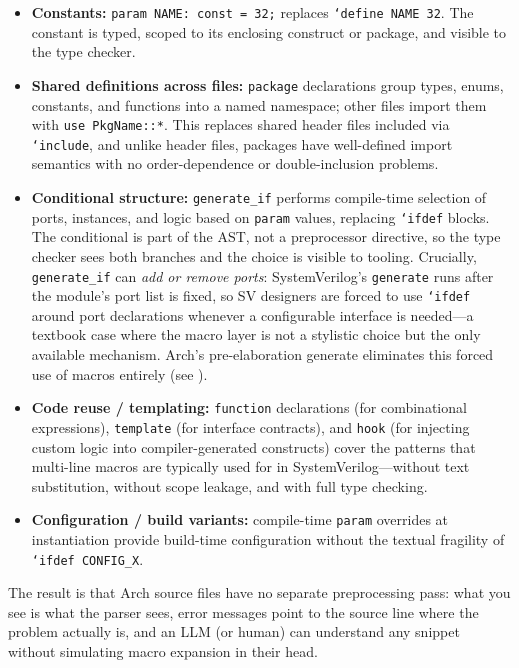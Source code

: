 \documentclass[manuscript]{acmart}
\begin{document}
\begin{itemize}
\item \textbf{Constants:} \texttt{param NAME: const = 32;} replaces \texttt{`define NAME 32}. The constant is typed, scoped to its enclosing construct or package, and visible to the type checker.
\item \textbf{Shared definitions across files:} \texttt{package} declarations group types, enums, constants, and functions into a named namespace; other files import them with \texttt{use PkgName::*}. This replaces shared header files included via \texttt{`include}, and unlike header files, packages have well-defined import semantics with no order-dependence or double-inclusion problems.
\item \textbf{Conditional structure:} \texttt{generate\_if} performs compile-time selection of ports, instances, and logic based on \texttt{param} values, replacing \texttt{`ifdef} blocks. The conditional is part of the AST, not a preprocessor directive, so the type checker sees both branches and the choice is visible to tooling. Crucially, \texttt{generate\_if} can \emph{add or remove ports}: SystemVerilog's \texttt{generate} runs after the module's port list is fixed, so SV designers are forced to use \texttt{`ifdef} around port declarations whenever a configurable interface is needed---a textbook case where the macro layer is not a stylistic choice but the only available mechanism. Arch's pre-elaboration generate eliminates this forced use of macros entirely (see ).
\item \textbf{Code reuse / templating:} \texttt{function} declarations (for combinational expressions), \texttt{template} (for interface contracts), and \texttt{hook} (for injecting custom logic into compiler-generated constructs) cover the patterns that multi-line macros are typically used for in SystemVerilog---without text substitution, without scope leakage, and with full type checking.
\item \textbf{Configuration / build variants:} compile-time \texttt{param} overrides at instantiation provide build-time configuration without the textual fragility of \texttt{`ifdef CONFIG\_X}.
\end{itemize}

The result is that Arch source files have no separate preprocessing pass: what you see is what the parser sees, error messages point to the source line where the problem actually is, and an LLM (or human) can understand any snippet without simulating macro expansion in their head.
\end{document}
